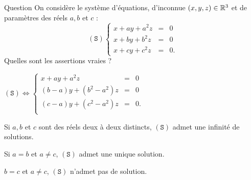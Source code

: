\begin{multi}[multiple,feedback=
{\[(\mathtt{S}) \Leftrightarrow  
\left\{\begin{array}{rcc}
x+ay+a^2z&=&0\\
(b-a)y+(b^2-a^2)z&=&0\\ 
(c-a)y+(c^2-a^2)z&=&0.\\ 
\end{array}\right.\]
\begin{enumerate}
\item[-]Si \(a=b=c\), \((\mathtt{S})\Leftrightarrow  x+ay+a^2z=0 \), \((\mathtt{S})\) admet donc une infinité de solutions.
\item[-]Si \(a=b\) et \(a\neq c\), ou \(a=c\) et \(a\neq b\), ou  \(b=c\) et \(b\neq a\), \((\mathtt{S})\) admet  une infinité de solutions.
\item[-]Si \(a,b,c\) sont deux à deux distincts, \((\mathtt{S})\) admet donc une unique solution : \((0,0,0)\).
\end{enumerate}
}]{Question}
On considère le système d'équations, d'inconnue \((x,y,z)\in \mathbb{R}^3\) et de paramètres des réels  \(a,b\) et \(c\) : 
\[(\mathtt{S})  
\left\{\begin{array}{rcc}
x+ay+a^2z&=&0\\
x+by+b^2z&=&0\\ 
x+cy+c^2z&=&0.\end{array}\right.\]
Quelles sont les assertions vraies ?

    \item* \((\mathtt{S}) \Leftrightarrow
\left\{\begin{array}{rcc}
x+ay+a^2z&=&0\\
(b-a)y+(b^2-a^2)z&=&0\\
(c-a)y+(c^2-a^2)z&=&0.\\
\end{array}\right.\)
    \item Si \(a,b\) et \(c\) sont des réels deux à deux distincts,  \((\mathtt{S})\) admet une infinité de solutions.
    \item Si \(a=b\) et \(a\neq c\),  \((\mathtt{S})\) admet une unique  solution.
    \item \(b=c\) et \(a\neq c\), \((\mathtt{S})\) n'admet pas de solution.
\end{multi}


